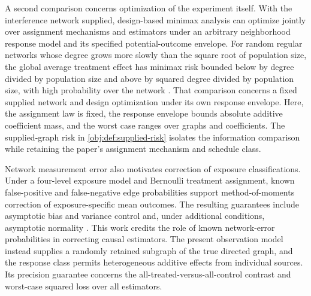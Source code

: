 A second comparison concerns optimization of the experiment itself. With the interference network supplied, design-based minimax analysis can optimize jointly over assignment mechanisms and estimators under an arbitrary neighborhood response model and its specified potential-outcome envelope. For random regular networks whose degree grows more slowly than the square root of population size, the global average treatment effect has minimax risk bounded below by degree divided by population size and above by squared degree divided by population size, with high probability over the network \citep[Corollary 5.4]{KandirosHarshawSavje2026DesignBasedMinimax}. That comparison concerns a fixed supplied network and design optimization under its own response envelope. Here, the assignment law is fixed, the response envelope bounds absolute additive coefficient mass, and the worst case ranges over graphs and coefficients. The supplied-graph risk in \cref{obj:def:supplied-risk} isolates the information comparison while retaining the paper's assignment mechanism and schedule class.

Network measurement error also motivates correction of exposure classifications. Under a four-level exposure model and Bernoulli treatment assignment, known false-positive and false-negative edge probabilities support method-of-moments correction of exposure-specific mean outcomes. The resulting guarantees include asymptotic bias and variance control and, under additional conditions, asymptotic normality \citep[Section 3; Theorems 4--7]{LiSussmanKolaczyk2021NetworkNoise}. This work credits the role of known network-error probabilities in correcting causal estimators. The present observation model instead supplies a randomly retained subgraph of the true directed graph, and the response class permits heterogeneous additive effects from individual sources. Its precision guarantee concerns the all-treated-versus-all-control contrast and worst-case squared loss over all estimators.

